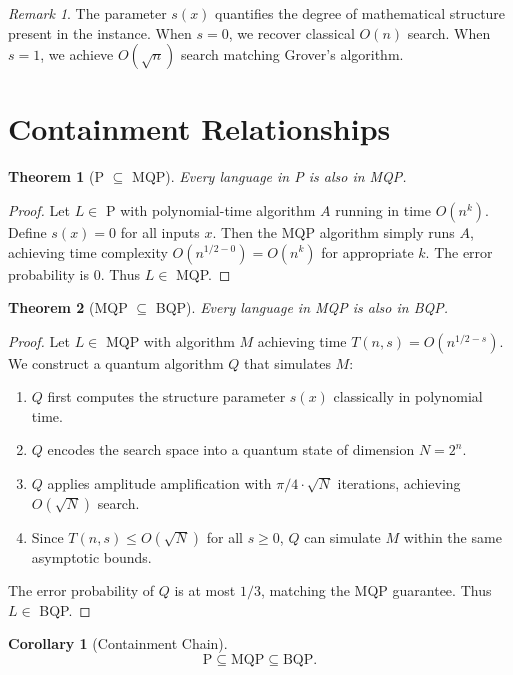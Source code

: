 \documentclass{article}
\newtheorem{theorem}{Theorem}
\newtheorem{corollary}{Corollary}
\theoremstyle{remark}
\newtheorem{remark}{Remark}
\begin{document}
\begin{remark}
The parameter $s(x)$ quantifies the degree of mathematical structure present in the instance. When $s = 0$, we recover classical $O(n)$ search. When $s = 1$, we achieve $O(\sqrt{n})$ search matching Grover's algorithm.
\end{remark}

\section{Containment Relationships}

\begin{theorem}[P $\subseteq$ MQP]
Every language in P is also in MQP.
\end{theorem}

\begin{proof}
Let $L \in$ P with polynomial-time algorithm $A$ running in time $O(n^k)$. Define $s(x) = 0$ for all inputs $x$. Then the MQP algorithm simply runs $A$, achieving time complexity $O(n^{1/2-0}) = O(n^k)$ for appropriate $k$. The error probability is 0. Thus $L \in$ MQP.
\end{proof}

\begin{theorem}[MQP $\subseteq$ BQP]
Every language in MQP is also in BQP.
\end{theorem}

\begin{proof}
Let $L \in$ MQP with algorithm $M$ achieving time $T(n,s) = O(n^{1/2-s})$. We construct a quantum algorithm $Q$ that simulates $M$:

\begin{enumerate}
\item $Q$ first computes the structure parameter $s(x)$ classically in polynomial time.
\item $Q$ encodes the search space into a quantum state of dimension $N = 2^n$.
\item $Q$ applies amplitude amplification with $\pi/4 \cdot \sqrt{N}$ iterations, achieving $O(\sqrt{N})$ search.
\item Since $T(n,s) \leq O(\sqrt{N})$ for all $s \geq 0$, $Q$ can simulate $M$ within the same asymptotic bounds.
\end{enumerate}

The error probability of $Q$ is at most $1/3$, matching the MQP guarantee. Thus $L \in$ BQP.
\end{proof}

\begin{corollary}[Containment Chain]
\[
\text{P} \subseteq \text{MQP} \subseteq \text{BQP}.
\]
\end{corollary}
\end{document}
